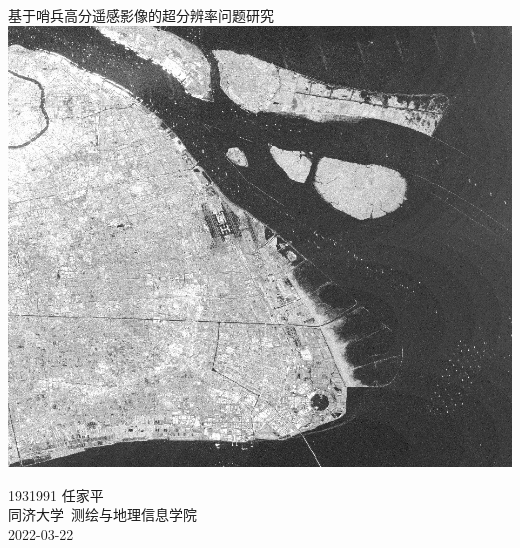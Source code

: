 \documentclass[a4paper, 12pt]{article}
\begin{document}
\begin{center}
    {\huge 
        基于哨兵高分遥感影像的超分辨率问题研究}\\[20pt]
    
    \includegraphics[scale=0.4]{pic/cover.jpg}  

    {\Large 
        1931991 任家平\\[12pt]
        同济大学~测绘与地理信息学院\\[12pt]
        2022-03-22}
\end{center}
\thispagestyle{empty}



\newpage
{}
\tableofcontents
\newpage
{}







\listoffigures
{}
\listoftables
{}
\newpage
\nocite{*}


\end{document}
